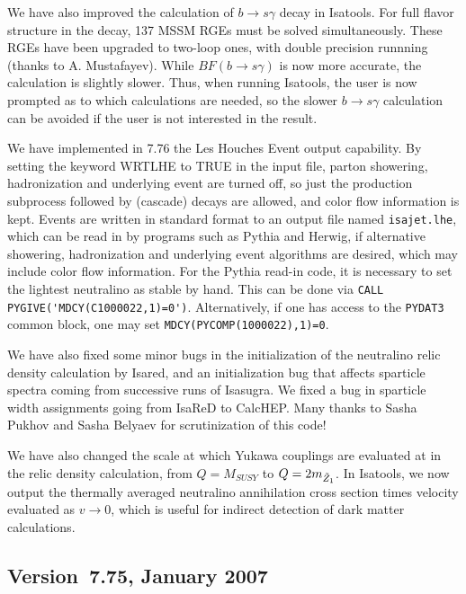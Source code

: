 We have also improved the calculation of $b\rightarrow s\gamma$ decay in Isatools.
For full flavor structure in the decay, 137 MSSM RGEs must be solved simultaneously. 
These RGEs have been upgraded to two-loop ones, with double precision runnning
(thanks to A. Mustafayev).
While $BF(b\rightarrow s\gamma )$ is now more accurate, the calculation is 
slightly slower. Thus, when running Isatools, the user is now prompted 
as to which calculations are needed, so the slower $b\rightarrow s\gamma$ calculation 
can be avoided if the user is not interested in the result.

We have implemented in 7.76 the Les Houches Event output capability. 
By setting  the keyword WRTLHE to TRUE in the input file, parton showering,
hadronization and underlying event are turned off, so just the production
subprocess followed by (cascade) decays are allowed, and color flow information is
kept. Events are written in standard format to an output file named \verb|isajet.lhe|,
which can be read in by programs such as Pythia and Herwig, if alternative 
showering, hadronization and underlying event algorithms are desired, which may include 
color flow information.
For the Pythia read-in code, it is necessary to set the lightest neutralino
as stable by hand. This can be done via \verb|CALL PYGIVE('MDCY(C1000022,1)=0')|. 
Alternatively, if one has access to the \verb|PYDAT3| common block, one may set 
\verb|MDCY(PYCOMP(1000022),1)=0|.

We have also fixed some minor bugs in the initialization of the neutralino relic density 
calculation by Isared, and an initialization bug that affects sparticle spectra 
coming from successive runs of Isasugra.
We fixed a bug in sparticle width assignments going from IsaReD to CalcHEP.
Many thanks to Sasha Pukhov and Sasha Belyaev for scrutinization of this code!

We have also changed the scale at which Yukawa couplings are evaluated at in the relic 
density calculation, from $Q=M_{SUSY}$ to $Q=2m_{\tilde Z_1}$. In Isatools, we now output
the thermally averaged neutralino annihilation cross section times velocity evaluated 
as $v\rightarrow 0$, which is useful for indirect detection of dark matter calculations.

\subsection{Version~7.75, January 2007}

